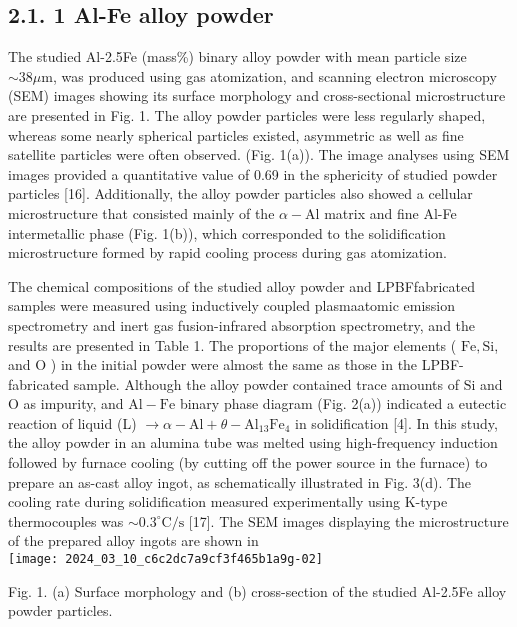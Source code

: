 \documentclass[10pt]{article}
\begin{document}
\subsection*{2.1. 1 Al-Fe alloy powder}
The studied Al-2.5Fe (mass\%) binary alloy powder with mean particle size $\sim 38 \mu \mathrm{m}$, was produced using gas atomization, and scanning electron microscopy (SEM) images showing its surface morphology and cross-sectional microstructure are presented in Fig. 1. The alloy powder particles were less regularly shaped, whereas some nearly spherical particles existed, asymmetric as well as fine satellite particles were often observed. (Fig. 1(a)). The image analyses using SEM images provided a quantitative value of 0.69 in the sphericity of studied powder particles [16]. Additionally, the alloy powder particles also showed a cellular microstructure that consisted mainly of the $\alpha-\mathrm{Al}$ matrix and fine Al-Fe intermetallic phase (Fig. 1(b)), which corresponded to the solidification microstructure formed by rapid cooling process during gas atomization.

The chemical compositions of the studied alloy powder and LPBFfabricated samples were measured using inductively coupled plasmaatomic emission spectrometry and inert gas fusion-infrared absorption spectrometry, and the results are presented in Table 1. The proportions of the major elements ( $\mathrm{Fe}, \mathrm{Si}$, and $\mathrm{O}$ ) in the initial powder were almost the same as those in the LPBF-fabricated sample. Although the alloy powder contained trace amounts of $\mathrm{Si}$ and $\mathrm{O}$ as impurity, and $\mathrm{Al}-\mathrm{Fe}$ binary phase diagram (Fig. 2(a)) indicated a eutectic reaction of liquid (L) $\rightarrow \alpha-\mathrm{Al}+\theta-\mathrm{Al}_{13} \mathrm{Fe}_{4}$ in solidification [4]. In this study, the alloy powder in an alumina tube was melted using high-frequency induction followed by furnace cooling (by cutting off the power source in the furnace) to prepare an as-cast alloy ingot, as schematically illustrated in Fig. 3(d). The cooling rate during solidification measured experimentally using K-type thermocouples was $\sim 0.3^{\circ} \mathrm{C} / \mathrm{s}$ [17]. The SEM images displaying the microstructure of the prepared alloy ingots are shown in\\
\texttt{[image: 2024\_03\_10\_c6c2dc7a9cf3f465b1a9g-02]}

Fig. 1. (a) Surface morphology and (b) cross-section of the studied Al-2.5Fe alloy powder particles.
\end{document}
